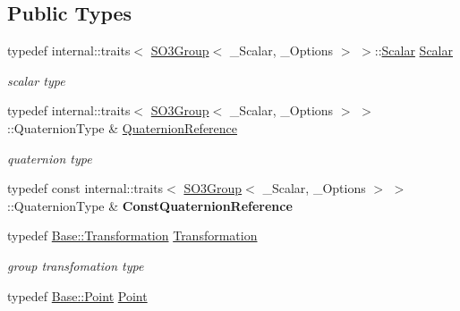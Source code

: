 \subsection*{Public Types}
\begin{DoxyCompactItemize}
\item 
typedef internal\+::traits$<$ \hyperlink{class_sophus_1_1_s_o3_group}{S\+O3\+Group}$<$ \+\_\+\+Scalar, \+\_\+\+Options $>$ $>$\+::\hyperlink{class_sophus_1_1_s_o3_group_a2b1432aa3eac9b174e41df7ce504cb06}{Scalar} \hyperlink{class_sophus_1_1_s_o3_group_a2b1432aa3eac9b174e41df7ce504cb06}{Scalar}\hypertarget{class_sophus_1_1_s_o3_group_a2b1432aa3eac9b174e41df7ce504cb06}{}\label{class_sophus_1_1_s_o3_group_a2b1432aa3eac9b174e41df7ce504cb06}

\begin{DoxyCompactList}\small\item\em scalar type \end{DoxyCompactList}\item 
typedef internal\+::traits$<$ \hyperlink{class_sophus_1_1_s_o3_group}{S\+O3\+Group}$<$ \+\_\+\+Scalar, \+\_\+\+Options $>$ $>$\+::Quaternion\+Type \& \hyperlink{class_sophus_1_1_s_o3_group_aaa65d0f058d31e972da558d6d909a2da}{Quaternion\+Reference}\hypertarget{class_sophus_1_1_s_o3_group_aaa65d0f058d31e972da558d6d909a2da}{}\label{class_sophus_1_1_s_o3_group_aaa65d0f058d31e972da558d6d909a2da}

\begin{DoxyCompactList}\small\item\em quaternion type \end{DoxyCompactList}\item 
typedef const internal\+::traits$<$ \hyperlink{class_sophus_1_1_s_o3_group}{S\+O3\+Group}$<$ \+\_\+\+Scalar, \+\_\+\+Options $>$ $>$\+::Quaternion\+Type \& {\bfseries Const\+Quaternion\+Reference}\hypertarget{class_sophus_1_1_s_o3_group_af8850e9ff5922a59ab5e6281fc2eaa89}{}\label{class_sophus_1_1_s_o3_group_af8850e9ff5922a59ab5e6281fc2eaa89}

\item 
typedef \hyperlink{class_sophus_1_1_s_o3_group_base_aa20fc57bf1b355a6616f5c4b785f1fc5}{Base\+::\+Transformation} \hyperlink{class_sophus_1_1_s_o3_group_a7fd4c61cae92c71a763d4f999c87fb9b}{Transformation}\hypertarget{class_sophus_1_1_s_o3_group_a7fd4c61cae92c71a763d4f999c87fb9b}{}\label{class_sophus_1_1_s_o3_group_a7fd4c61cae92c71a763d4f999c87fb9b}

\begin{DoxyCompactList}\small\item\em group transfomation type \end{DoxyCompactList}\item 
typedef \hyperlink{class_sophus_1_1_s_o3_group_base_a1cfbc3b3a28e1f70b3e1845716db0a1b}{Base\+::\+Point} \hyperlink{class_sophus_1_1_s_o3_group_aa56828c78f215b8c048304ae99d165c6}{Point}\hypertarget{class_sophus_1_1_s_o3_group_aa56828c78f215b8c048304ae99d165c6}{}\label{class_sophus_1_1_s_o3_group_aa56828c78f215b8c048304ae99d165c6}


\end{DoxyCompactItemize}
